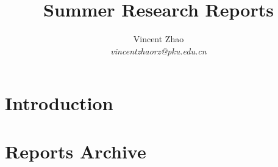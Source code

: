 \documentclass[a4paper, 12pt]{article}
\begin{document}
\title{Summer Research Reports}
\author{Vincent Zhao\\
		\textit{vincentzhaorz@pku.edu.cn}}
\maketitle

\tableofcontents

\newpage

\section{Introduction}
\section{Reports Archive}

\end{document}
